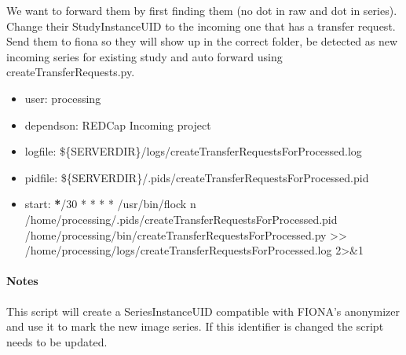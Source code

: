 \documentclass[letterpaper,10pt,english]{sphinxmanual}
\begin{document}
\sphinxAtStartPar
We want to forward them by first finding them (no dot in raw and dot
in series). Change their StudyInstanceUID to the incoming
one that has a transfer request. Send them to fiona so they will
show up in the correct folder, be detected as new incoming series for
existing study and auto forward using createTransferRequests.py.
\begin{itemize}
\item {} 
\sphinxAtStartPar
user: processing

\item {} 
\sphinxAtStartPar
depends\sphinxhyphen{}on:
\sphinxhyphen{} REDCap Incoming project

\item {} 
\sphinxAtStartPar
log\sphinxhyphen{}file:
\sphinxhyphen{} \$\{SERVERDIR\}/logs/createTransferRequestsForProcessed.log

\item {} 
\sphinxAtStartPar
pid\sphinxhyphen{}file: \$\{SERVERDIR\}/.pids/createTransferRequestsForProcessed.pid

\item {} 
\sphinxAtStartPar
start:
{\color{red}\bfseries{}*}/30 * * * * /usr/bin/flock \sphinxhyphen{}n /home/processing/.pids/createTransferRequestsForProcessed.pid /home/processing/bin/createTransferRequestsForProcessed.py \textgreater{}\textgreater{} /home/processing/logs/createTransferRequestsForProcessed.log 2\textgreater{}\&1

\end{itemize}


\paragraph{Notes}
\label{\detokenize{Architecture/scripts/createTransferRequestsForProcessed:notes}}
\sphinxAtStartPar
This script will create a SeriesInstanceUID compatible with FIONA’s anonymizer and use it to mark the new image series. If this identifier is changed the script needs to be updated.

\begin{sphinxVerbatim}[commandchars=\\\{\}]

  
      
      
         
     \PYG{p}{[}\PYG{p}{]}
\end{sphinxVerbatim}
\end{document}
